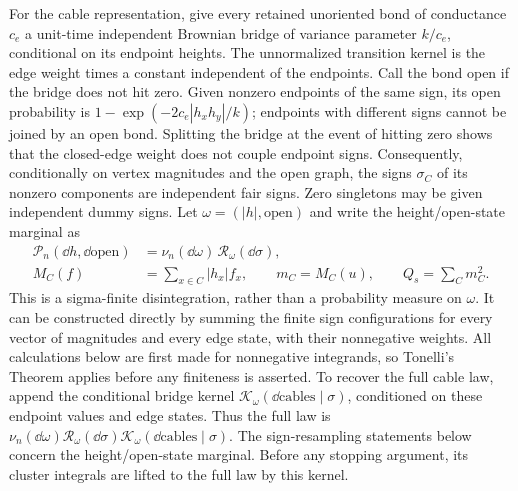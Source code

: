 For the cable representation, give every retained unoriented bond
of conductance $c_e$ a unit-time independent Brownian bridge of
variance parameter $k/c_e$, conditional on its endpoint heights.
The unnormalized transition kernel is the edge weight times a
constant independent of the endpoints.  Call the bond open if the
bridge does not hit zero.  Given nonzero endpoints of the same sign,
its open probability is
$1-\exp(-2c_e|h_xh_y|/k)$; endpoints with different signs cannot be
joined by an open bond.  Splitting the bridge at the event of hitting
zero shows that the closed-edge weight does not couple endpoint
signs.  Consequently, conditionally on vertex magnitudes and the
open graph, the signs $\sigma_C$ of its nonzero components are
independent fair signs.  Zero singletons may be given independent
dummy signs.  Let $\omega=(|h|,\mathrm{open})$ and write the
height/open-state marginal as
\begin{equation}\label{an:sign-disintegration}
 \begin{aligned}
 \mathcal P_n(\dd h,\dd\mathrm{open})
     &=\nu_n(\dd\omega)\,\mathcal R_\omega(\dd\sigma),\\
 M_C(f)&=\sum_{x\in C}|h_x|f_x,\qquad
 m_C=M_C(u),\qquad Q_s=\sum_Cm_C^2.
 \end{aligned}
\end{equation}
This is a sigma-finite disintegration, rather than a probability
measure on $\omega$.  It can be constructed directly by summing the
finite sign configurations for every vector of magnitudes and every
edge state, with their nonnegative weights.  All calculations below
are first made for nonnegative integrands, so Tonelli's Theorem
applies before any finiteness is asserted.
To recover the full cable law, append the conditional bridge kernel
$\mathcal K_\omega(\dd\mathrm{cables}\mid\sigma)$, conditioned on these
endpoint values and edge states.  Thus the full law is
$\nu_n(\dd\omega)\mathcal R_\omega(\dd\sigma)
\mathcal K_\omega(\dd\mathrm{cables}\mid\sigma)$.
The sign-resampling statements below concern the height/open-state
marginal.  Before any stopping argument, its cluster integrals are
lifted to the full law by this kernel.

